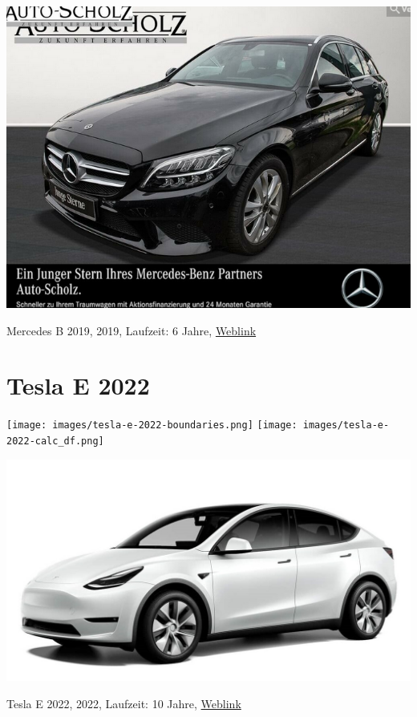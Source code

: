 \documentclass[landscape, DIV=99, 14pt]{scrartcl}
\begin{document}
\pagebreak
\null
\vspace{2cm}
\begin{center}
\includegraphics[width=0.9\columnwidth]{cars/mercedes-c-200-t.png}

Mercedes B 2019, 2019, Laufzeit: 6 Jahre, \href{https://suchen.mobile.de/fahrzeuge/details.html?action=parkItem&id=327113608}{Weblink}
\end{center}

\pagebreak


\twocolumn

\section*{Tesla E 2022}
\begin{center}
\texttt{[image: images/tesla-e-2022-boundaries.png]}
\null
\vspace{0.5cm}
\texttt{[image: images/tesla-e-2022-calc\_df.png]}
\end{center}

\pagebreak
\null
\vspace{2cm}
\begin{center}
\includegraphics[width=0.9\columnwidth]{cars/tesla-model-y.jpg}

Tesla E 2022, 2022, Laufzeit: 10 Jahre, \href{https://www.tesla.com/de_de/modely/design\#overview}{Weblink}
\end{center}
\end{document}
